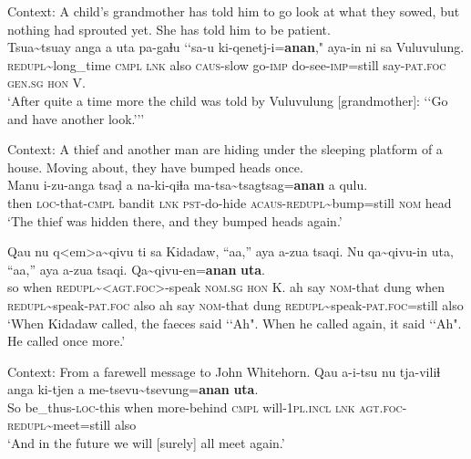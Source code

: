 \begin{exe}
	\ex\label{exAppendixPaiwanIterative1}Context: A child’s grandmother has told him to go look at what they sowed, but nothing had sprouted yet. She has told him to be patient.\\
	\gll Tsua\sim tsuay anga a uta pa-gaɬu \lq\lq sa-u ki-qenetj-i=\textbf{anan}," aya-in ni sa Vuluvulung.\\
\textsc{redupl}\sim long\_time \textsc{cmpl} \textsc{lnk} also \textsc{caus}-slow \phantom{\lq\lq}go-\textsc{imp} do-see-\textsc{imp}=still say-\textsc{pat}.\textsc{foc} \textsc{gen}.\textsc{sg} \textsc{hon} V.\\
\glt \lq After quite a time more the child was told by Vuluvulung [grandmother]: \lq\lq{}Go and have another look.{\rq\rq}\rq{ }\parencite[145]{EarlyWhitehorn2003}


	\ex\label{exAppendixPaiwanIterative2}
	 Context: A thief and another man are hiding under the sleeping platform of a house. Moving about, they have bumped heads once.\\
	\gll Manu i-zu-anga tsaḍ a na-ki-qiɬa ma-tsa\sim{}tsagtsag=\textbf{anan} a qulu.\\
	then \textsc{loc}-that-\textsc{cmpl} bandit \textsc{lnk} \textsc{pst}-do-hide \textsc{acaus}-\textsc{redupl}\sim{}bump=still \textsc{nom} head\\
	\glt \lq The thief was hidden there, and they bumped heads again.\rq{ }\parencite[91]{EarlyWhitehorn2003}

	\ex\label{exAppendixPaiwanIterative3}
	\gll Qau nu q<em>a\sim{}qivu ti sa Kidadaw, “aa,” aya a-zua  tsaqi. Nu  qa\sim{}qivu-in uta, “aa,” aya a-zua tsaqi. Qa\sim{}qivu-en=\textbf{anan} \textbf{uta}.\\
	so when \textsc{redupl}\sim{}<\textsc{agt}.\textsc{foc}>-speak \textsc{nom}.\textsc{sg} \textsc{hon} K. \phantom{\lq\lq}ah say \textsc{nom}-that dung when \textsc{redupl}\sim{}speak-\textsc{pat}.\textsc{foc} also \phantom{\lq\lq}ah say \textsc{nom}-that dung \textsc{redupl}\sim{}speak-\textsc{pat}.\textsc{foc}=still also\\
	\glt \lq When Kidadaw called, the faeces said \lq\lq Ah". When he called again, it said \lq\lq Ah". He called once more.' \parencite[70]{EarlyWhitehorn2003}
	
	\ex\label{exAppendixPaiwanIterative4}
	Context: From a farewell message to John Whitehorn.
	\exi{}\gll Qau a-i-tsu nu tja-viliɬ anga ki-tjen a me-tsevu\sim{}tsevung=\textbf{anan} \textbf{uta}.\\
	So be\_thus-\textsc{loc}-this when more-behind \textsc{cmpl} will-1\textsc{pl}.\textsc{incl} \textsc{lnk} \textsc{agt}.\textsc{foc}-\textsc{redupl}\sim{}meet=still also\\
	\glt \lq And in the future we will [surely] all meet again.\rq{ }\parencite[482]{EarlyWhitehorn2003}
	

\end{exe}
